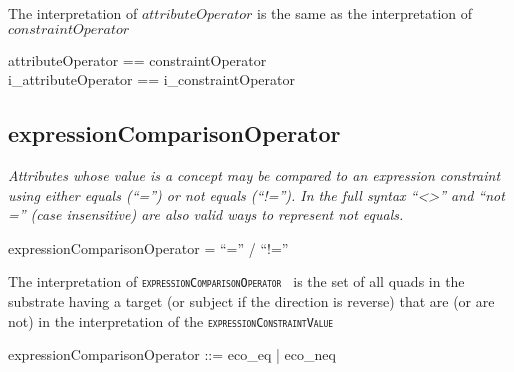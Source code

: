 \documentclass{article}
\def\spec#1{{\tt \small \textsc{{#1}} }}
\def\bnf#1{{\scriptsize {{#1}} }}
\def\desc#1{{\small \textsl{{#1}} }}
\begin{document}
The interpretation of $attributeOperator$ is the same as the interpretation of $constraintOperator$

\begin{zed}
attributeOperator == constraintOperator \\
i\_attributeOperator == i\_constraintOperator
\end{zed}

\subsection{expressionComparisonOperator}
\begin{framed}
\desc{Attributes whose value is a concept may be compared to an expression constraint using either equals (``='') or not equals (``!=''). In the full syntax ``\textless\textgreater'' and ``not ='' (case insensitive) are also  valid ways to represent not equals.}
\end{framed}

\begin{framed}
\noindent
\bnf{expressionComparisonOperator = ``='' / ``!=''}
\end{framed}

The interpretation of \spec{expressionComparisonOperator} is the set of all quads in the substrate having a target (or subject if the direction is reverse) that are (or are not) in
the interpretation of the \spec{expressionConstraintValue}


\begin{zed}
expressionComparisonOperator ::= eco\_eq | eco\_neq
\end{zed}
\end{document}

